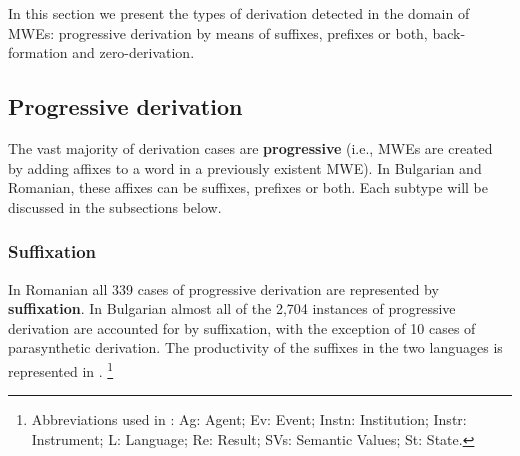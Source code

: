 \documentclass[output=paper]{langsci/langscibook}
\begin{document}
In this section we present the types of derivation detected in the
domain of MWEs: progressive derivation by means of suffixes, prefixes
or both, back-\linebreak formation and zero-derivation.


\subsection{Progressive derivation}

The vast majority of derivation cases are \textbf{progressive} (i.e.,
MWEs are created by adding affixes to a word in a previously existent
MWE). In Bulgarian and Romanian, these affixes can be suffixes,
prefixes or both. Each subtype will be discussed in the subsections below.

\subsubsection{Suffixation}
\label{suffication}

In Romanian all 339 cases of progressive derivation are represented by 
\textbf{suffixation}. In Bulgarian almost all of the 2,704 instances of
progressive derivation are accounted for by suffixation, with the
exception of 10 cases of parasynthetic derivation. The productivity of
the suffixes in the two languages is represented in  .%
\footnote{Abbreviations used in  : Ag: Agent; Ev: Event;  Instn: Institution; Instr: Instrument; L: Language; Re: Result; SVs: Semantic Values; St: State.}
\end{document}
